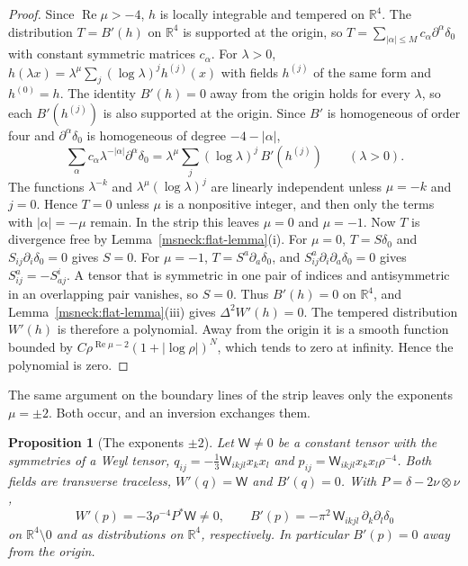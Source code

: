 \documentclass[11pt]{article}
\numberwithin{equation}{section}
\newtheorem{proposition}[theorem]{Proposition}
\theoremstyle{definition}
\theoremstyle{remark}
\begin{document}
\begin{proof}
Since \(\operatorname{Re}\mu>-4\), \(h\) is locally integrable and
tempered on \(\mathbb R^4\). The distribution \(T=B'(h)\) on \(\mathbb R^4\)
is supported at the origin, so \(T=\sum_{|\alpha|\le M}c_\alpha\partial^\alpha\delta_0\)
with constant symmetric matrices \(c_\alpha\). For \(\lambda>0\),
\(h(\lambda x)=\lambda^\mu\sum_j(\log\lambda)^jh^{(j)}(x)\) with fields
\(h^{(j)}\) of the same form and \(h^{(0)}=h\). The identity
\(B'(h)=0\) away from the origin holds for every \(\lambda\), so each
\(B'(h^{(j)})\) is also supported at the origin. Since \(B'\) is
homogeneous of order four and \(\partial^\alpha\delta_0\) is homogeneous of
degree \(-4-|\alpha|\),
\[
 \sum_\alpha c_\alpha\lambda^{-|\alpha|}\partial^\alpha\delta_0
 =\lambda^\mu\sum_j(\log\lambda)^j\,B'(h^{(j)})\qquad(\lambda>0).
\]
The functions \(\lambda^{-k}\) and \(\lambda^\mu(\log\lambda)^j\) are linearly
independent unless \(\mu=-k\) and \(j=0\). Hence \(T=0\) unless \(\mu\) is a
nonpositive integer, and then only the terms with \(|\alpha|=-\mu\) remain.
In the strip this leaves \(\mu=0\) and \(\mu=-1\). Now \(T\) is divergence
free by Lemma~\ref{msneck:flat-lemma}(i). For \(\mu=0\), \(T=S\delta_0\)
and \(S_{ij}\partial_i\delta_0=0\) gives \(S=0\). For \(\mu=-1\),
\(T=S^a\partial_a\delta_0\), and \(S^a_{ij}\partial_i\partial_a\delta_0=0\) gives
\(S^a_{ij}=-S^i_{aj}\). A tensor that is symmetric in one pair of indices
and antisymmetric in an overlapping pair vanishes, so \(S=0\). Thus
\(B'(h)=0\) on \(\mathbb R^4\), and Lemma~\ref{msneck:flat-lemma}(iii) gives
\(\Delta^2W'(h)=0\). The tempered distribution \(W'(h)\) is therefore a
polynomial. Away from the origin it is a smooth function bounded by
\(C\rho^{\operatorname{Re}\mu-2}(1+|\log\rho|)^N\), which tends to zero at
infinity. Hence the polynomial is zero.
\end{proof}

The same argument on the boundary lines of the strip leaves only the
exponents \(\mu=\pm2\). Both occur, and an inversion exchanges them.

\begin{proposition}[The exponents \(\pm2\)]\label{msneck:pm2}
Let \(\mathsf W\ne0\) be a constant tensor with the symmetries of a Weyl
tensor, \(q_{ij}=-\tfrac13\mathsf W_{ikjl}x_kx_l\) and
\(p_{ij}=\mathsf W_{ikjl}x_kx_l\rho^{-4}\). Both fields are transverse
traceless, \(W'(q)=\mathsf W\) and \(B'(q)=0\). With \(P=\delta-2\nu\otimes\nu\),
\[
 W'(p)=-3\rho^{-4}P^*\mathsf W\ne0,\qquad
 B'(p)=-\pi^2\,\mathsf W_{ikjl}\,\partial_k\partial_l\delta_0
\]
on \(\mathbb R^4\setminus0\) and as distributions on \(\mathbb R^4\),
respectively. In particular \(B'(p)=0\) away from the origin.
\end{proposition}
\end{document}
